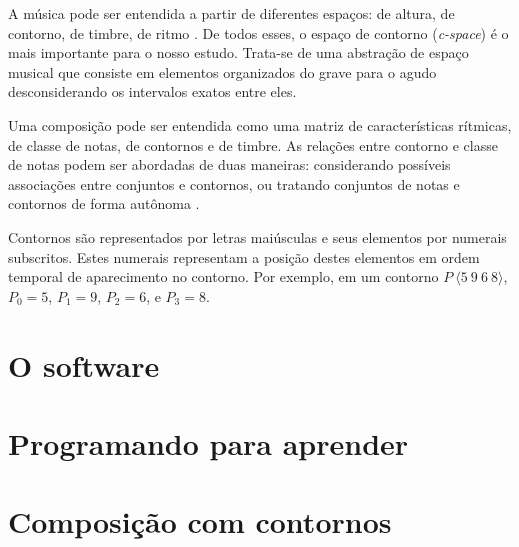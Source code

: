 \documentclass{article}
\newcommand{\eng}[1]{\textit{#1}}
\begin{document}
A música pode ser entendida a partir de diferentes espaços: de altura,
de contorno, de timbre, de ritmo \cite{morris87:composition}. De todos
esses, o espaço de contorno (\eng{c-space}) é o mais importante para o
nosso estudo. Trata-se de uma abstração de espaço musical que consiste
em elementos organizados do grave para o agudo desconsiderando os
intervalos exatos entre eles.

Uma composição pode ser entendida como uma matriz de características
rítmicas, de classe de notas, de contornos e de timbre. As relações
entre contorno e classe de notas podem ser abordadas de duas maneiras:
considerando possíveis associações entre conjuntos e contornos, ou
tratando conjuntos de notas e contornos de forma autônoma
\cite{friedmann85:methodology}.

Contornos são representados por letras maiúsculas e seus elementos por
numerais subscritos. Estes numerais representam a posição destes
elementos em ordem temporal de aparecimento no contorno. Por exemplo,
em um contorno $P\:\langle5\:9\:6\:8\rangle$, $P_0 = 5$, $P_1 = 9$,
$P_2 = 6$, e $P_3 = 8$.

\section{O software}
\label{sec:o-software}

\section{Programando para aprender}
\label{sec:progr-para-aprend}

\section{Composição com contornos}
\label{sec:comp-com-cont}

\renewcommand{\refname}{Referências Bibliográficas}


\end{document}
